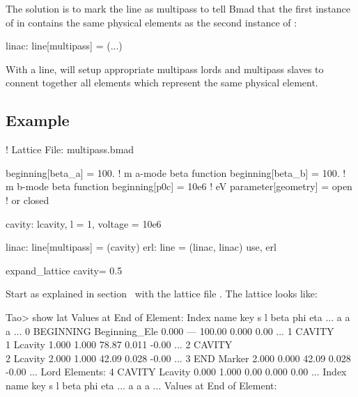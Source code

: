 \documentclass{hitec}
\begin{document}
The solution is to mark the  line as multipass to tell Bmad that the first instance of
 in  contains the same physical elements as the second instance of
:
\begin{code}
linac: line[multipass] = (...)
\end{code}

With a  line, \bmad will setup appropriate multipass lords and multipass slaves to
connent together all elements which represent the same physical element.

\newpage

\subsection{Example}

\begin{code}
! Lattice File: multipass.bmad

beginning[beta_a] = 100.   ! m  a-mode beta function
beginning[beta_b] = 100.   ! m  b-mode beta function
beginning[p0c] = 10e6   ! eV   
parameter[geometry] = open      ! or closed

cavity: lcavity, l = 1, voltage = 10e6

linac: line[multipass] = (cavity)
erl: line = (linac, linac) 
use, erl

expand_lattice                
cavity = 0.5
\end{code}

Start \tao as explained in section~ with the lattice file
. The lattice looks like:

\begin{code}
Tao> show lat
      Values at End of Element:
 Index  name      key                    s       l    beta     phi    eta ...
                                                         a       a      a ...
     0  BEGINNING Beginning_Ele      0.000     ---  100.00   0.000   0.00 ...
     1  CAVITY\\1  Lcavity           1.000   1.000   78.87   0.011  -0.00 ...
     2  CAVITY\\2  Lcavity           2.000   1.000   42.09   0.028  -0.00 ...
     3  END       Marker             2.000   0.000   42.09   0.028  -0.00 ...
Lord Elements:
     4  CAVITY    Lcavity            0.000   1.000    0.00   0.000   0.00 ...
 Index  name      key                    s       l    beta     phi    eta ...
                                                         a       a      a ...
  Values at End of Element:
\end{code}
\end{document}
